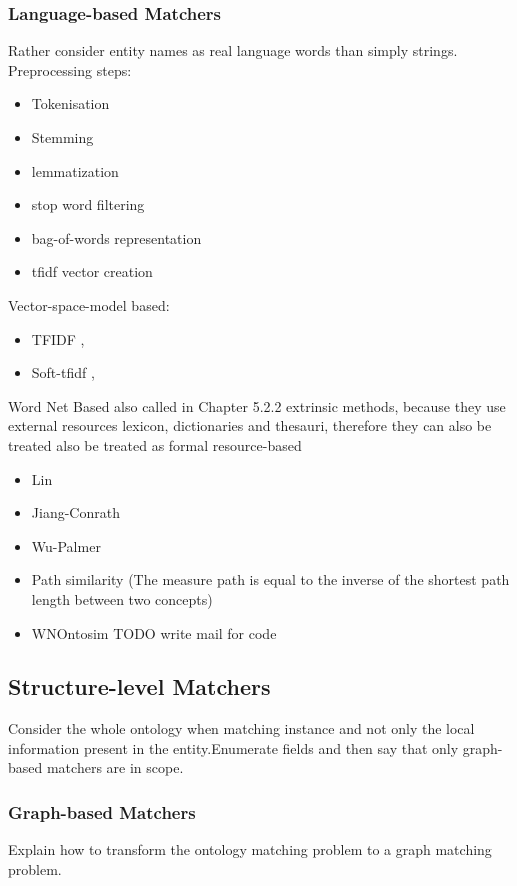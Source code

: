 \documentclass[11pt,titlepage,oneside,openany,a4paper]{report}
\begin{document}
	\subsubsection{Language-based Matchers}
	Rather consider entity names as real language words than simply strings.
	Preprocessing steps:
	\begin{itemize}
		\item Tokenisation
		\item Stemming \cite{porter1980}
		\item lemmatization
		\item stop word filtering
		\item bag-of-words representation \cite{Salton1975}
		\item tfidf vector creation \cite{Salton1975}
	\end{itemize}		
	
	Vector-space-model based:
	\begin{itemize}
		\item TFIDF \cite{Salton1975},
		\item  Soft-tfidf \cite{Cohen2003},
	\end{itemize}
	Word Net Based also called in  \cite{euzenat2013d} Chapter 5.2.2 extrinsic methods, because they use external resources lexicon, dictionaries and thesauri, therefore they can also be treated also be treated as formal resource-based
	\begin{itemize}
		\item Lin  \cite{lin1998}
		\item Jiang-Conrath \cite{jiang1997}
		\item Wu-Palmer \cite{wu1994verbs}
		\item Path similarity (The measure path is equal to the
inverse of the shortest path length between two concepts)   \cite{pedersen2004}
		\item WNOntosim \cite{He2011} TODO write mail for code
	\end{itemize}
\subsection{Structure-level Matchers}
Consider the whole ontology when matching instance and not only the local information present in the entity.Enumerate fields and then say that only graph-based matchers are in scope.
	\subsubsection{Graph-based Matchers}
Explain how to transform the ontology matching problem to a graph matching problem.
\end{document}
